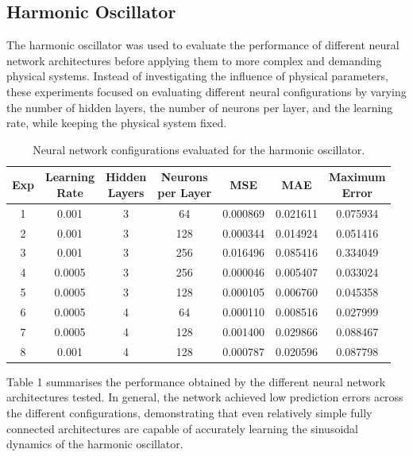 \subsection{Harmonic Oscillator}
The harmonic oscillator was used to evaluate the performance of different neural network architectures before applying them to more complex and demanding physical systems. Instead of investigating the influence of physical parameters, these experiments focused on evaluating different neural configurations by varying the number of hidden layers, the number of neurons per layer, and the learning rate, while keeping the physical system fixed.

\begin{table}[htbp]
\centering
\small
\begin{tabular}{ccccccc}
\toprule
Exp & 
\makecell{Learning\\Rate} & 
\makecell{Hidden\\Layers} & 
\makecell{Neurons\\per Layer} & 
MSE & 
MAE & 
\makecell{Maximum\\Error} \\
\midrule
1 & 0.001 & 3 & 64  & 0.000869 & 0.021611 & 0.075934 \\
2 & 0.001 & 3 & 128 & 0.000344 & 0.014924 & 0.051416 \\
3 & 0.001 & 3 & 256 & 0.016496 & 0.085416 & 0.334049 \\
4 & 0.0005 & 3 & 256 & 0.000046 & 0.005407 & 0.033024 \\
5 & 0.0005 & 3 & 128 & 0.000105 & 0.006760 & 0.045358 \\
6 & 0.0005 & 4 & 64  & 0.000110 & 0.008516 & 0.027999 \\
7 & 0.0005 & 4 & 128 & 0.001400 & 0.029866 & 0.088467 \\
8 & 0.001 & 4 & 128 & 0.000787 & 0.020596 & 0.087798 \\
\bottomrule
\end{tabular}
\caption{Neural network configurations evaluated for the harmonic oscillator.}
\label{tab:harmonic_architecture}
\end{table}

Table 1 summarises the performance obtained by the different neural network architectures tested. In general, the network achieved low prediction errors across the different configurations, demonstrating that even relatively simple fully connected architectures are capable of accurately learning the sinusoidal dynamics of the harmonic oscillator.

